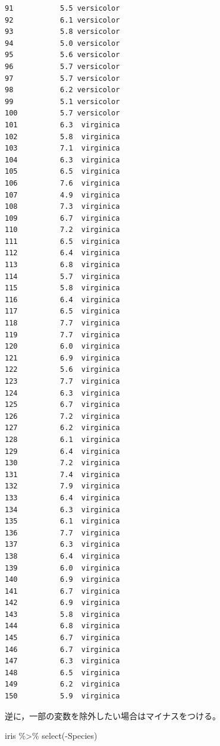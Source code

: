 \documentclass[
  a4paper,
]{ltjsbook}
\newenvironment{Shaded}{\begin{snugshade}}{\end{snugshade}}
\newcommand{\FunctionTok}[1]{\textcolor[rgb]{0.28,0.35,0.67}{#1}}
\newcommand{\NormalTok}[1]{\textcolor[rgb]{0.00,0.23,0.31}{#1}}
\newcommand{\SpecialCharTok}[1]{\textcolor[rgb]{0.37,0.37,0.37}{#1}}
\begin{document}
\begin{verbatim}
91           5.5 versicolor
92           6.1 versicolor
93           5.8 versicolor
94           5.0 versicolor
95           5.6 versicolor
96           5.7 versicolor
97           5.7 versicolor
98           6.2 versicolor
99           5.1 versicolor
100          5.7 versicolor
101          6.3  virginica
102          5.8  virginica
103          7.1  virginica
104          6.3  virginica
105          6.5  virginica
106          7.6  virginica
107          4.9  virginica
108          7.3  virginica
109          6.7  virginica
110          7.2  virginica
111          6.5  virginica
112          6.4  virginica
113          6.8  virginica
114          5.7  virginica
115          5.8  virginica
116          6.4  virginica
117          6.5  virginica
118          7.7  virginica
119          7.7  virginica
120          6.0  virginica
121          6.9  virginica
122          5.6  virginica
123          7.7  virginica
124          6.3  virginica
125          6.7  virginica
126          7.2  virginica
127          6.2  virginica
128          6.1  virginica
129          6.4  virginica
130          7.2  virginica
131          7.4  virginica
132          7.9  virginica
133          6.4  virginica
134          6.3  virginica
135          6.1  virginica
136          7.7  virginica
137          6.3  virginica
138          6.4  virginica
139          6.0  virginica
140          6.9  virginica
141          6.7  virginica
142          6.9  virginica
143          5.8  virginica
144          6.8  virginica
145          6.7  virginica
146          6.7  virginica
147          6.3  virginica
148          6.5  virginica
149          6.2  virginica
150          5.9  virginica
\end{verbatim}

逆に，一部の変数を除外したい場合はマイナスをつける。

\begin{Shaded}
\begin{Highlighting}[]
\NormalTok{iris }\SpecialCharTok{\%\textgreater{}\%} \FunctionTok{select}\NormalTok{(}\SpecialCharTok{{-}}\NormalTok{Species)}
\end{Highlighting}
\end{Shaded}
\end{document}
